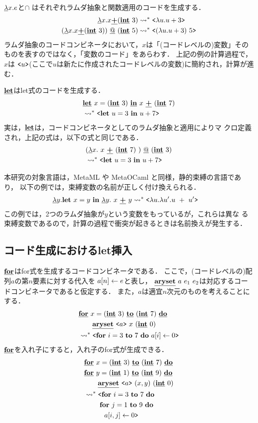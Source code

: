$\cfun{x}{e}$と$\cap$ はそれぞれラムダ抽象と関数適用のコードを生成する．
\begin{align*}
\cfun{x}{x \cPlus (\cint~3)}   & \too \code{\fun{u}{u+3}} \\
(\cfun{x}{x \cPlus (\cint~3)}) \cat (\cint~5) & \too
\code{(\fun{u}{u+3})~5}
\end{align*}
ラムダ抽象のコードコンビネータにおいて，$x$は「(コードレベルの)変数」その
ものを表すのではなく，「変数のコード」をあらわす．
上記の例の計算過程で，$x$は
$\code{u}$(ここで$u$は新たに作成されたコードレベルの変数)に簡約され，計算が進む．

$\cLet$はlet式のコードを生成する．
\begin{align*}
& \clet{x}{(\cint~3)}{x~ \cPlus~ (\cint~7)} \\
  & \too \code{\Let~ u = 3~ \In~ u + 7}
\end{align*}
実は，$\cLet$は，コードコンビネータとしてのラムダ抽象と適用によりマ
クロ定義され，上記の式は，以下の式と同じである．
\begin{align*}
& (\cfun{x}{~x~ \cPlus~ (\cint~7)~}) \cat (\cint~3)  \\
& \too \code{\Let~ u = 3~ \In~ u + 7}
\end{align*}

本研究の対象言語は，MetaML や MetaOCaml と同様，静的束縛の言語であり，
以下の例では，束縛変数の名前が正しく付け換えられる．
\begin{align*}
\cfun{y}{\Let~ x = y~ \In~ \cfun{y}{~x~ \cPlus~ y}{}}{}
& \too \code{\fun{u}{\fun{u'}{u~ +~ u'}}}
\end{align*}
この例では，2つのラムダ抽象が$y$という変数をもっているが，これらは異な
る束縛変数であるので，計算の過程で衝突が起きるときは名前換えが発生する．

\subsection{コード生成におけるlet挿入}

$\cFor$はfor式を生成するコードコンビネータである．
ここで，(コードレベルの)配列$a$の第$n$要素に対する代入を
$\aryset{a}{n}{e}$と表し，
$\caryset{a}{e_1}{e_2}$は対応するコードコンビネータであると仮定する．
また，$a$は適宜$n$次元のものを考えることにする．
\begin{align*}
& \cforin{x=(\cint~3)}{(\cint~7)} \\
& \qquad \caryset{\code{a}}{x}{(\cint~0)} \\
& \too \code{\forin{i=3}{7}~\aryset{a}{i}{0}}
\end{align*}
$\cFor$を入れ子にすると，入れ子のfor式が生成できる．
\begin{align*}
& \cforin{x=(\cint~3)}{(\cint~7)} \\
& \cforin{y=(\cint~1)}{(\cint~9)} \\
& \qquad \caryset{\code{a}}{(x,y)}{(\cint~0)} \\
& \too \codebegin \forin{i=3}{7} \\
& \phantom{\too \codebegin} \forin{j=1}{9} \\
& \phantom{\too \codebegin} ~~\aryset{a}{i,j}{0} \codeend
\end{align*}

